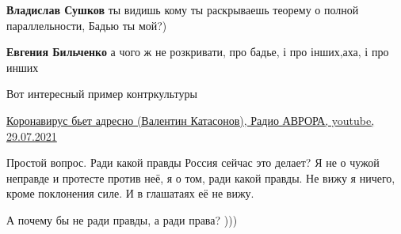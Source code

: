 \begin{itemize}
\begin{itemize}
 
\textbf{Владислав Сушков} ты видишь кому ты раскрываешь теорему о полной параллельности, Бадью ты мой?)

 
\textbf{Евгения Бильченко} а чого ж не розкривати, про бадье, і про інших,аха, і про инших

\end{itemize}

 
Вот интересный пример контркультуры 

\href{https://www.youtube.com/watch?app=desktop&v=_bFpxEiOcn0}{%
Коронавирус бьет адресно (Валентин Катасонов), Радио АВРОРА, youtube, 29.07.2021%
}

 
Простой вопрос. Ради какой правды Россия сейчас это делает? Я не о чужой
неправде и протесте против неё, я о том, ради какой правды. Не вижу я ничего,
кроме поклонения силе. И в глашатаях её не вижу.

\begin{itemize}
 
А почему бы не ради правды, а ради права? )))

 

\end{itemize}
\end{itemize}
